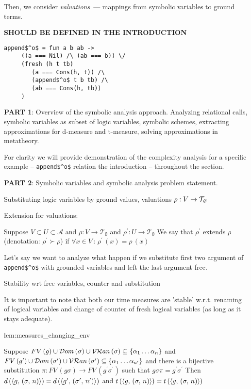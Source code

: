 Then, we consider
\emph{valuations}~--- mappings from symbolic variables to ground terms.


\colorbox{red!20}{\textbf{SHOULD BE DEFINED IN THE INTRODUCTION}}
\begin{lstlisting}[basicstyle=\small]
   append$^o$ = fun a b ab ->
     ((a === Nil) /\ (ab === b)) \/
     (fresh (h t tb)
        (a === Cons(h, t)) /\
        (append$^o$ t b tb) /\
        (ab === Cons(h, tb)) 
     )
\end{lstlisting}

\colorbox{blue!20}{\parbox{\textwidth}{\textbf{PART 1}: Overview of the symbolic analysis approach.
Analyzing relational calls, symbolic variables as subset of logic variables, symbolic schemes, extracting approximations for d-measure and t-measure, solving approximations in metatheory.}}

For clarity we will provide demonstration of the complexity analysis for a specific example -- \lstinline|append$^o$| relation the introduction  -- throughout the section.

\colorbox{blue!20}{\parbox{\textwidth}{\textbf{PART 2}: Symbolic variables and symbolic analysis problem statement.}}

\colorbox{blue!20}{\parbox{\textwidth}{Substituting logic variables by ground values, valuations $\rho : V \to \mathcal{T}_{\varnothing}$}}

Extension for valuations:

\begin{definition}
  Suppose
  $ V \subset U \subset \mathcal{A} $
  and
  $ \rho \colon V \to \mathcal{T}_{\emptyset} $
  and
  $ \rho^\prime \colon U \to \mathcal{T}_{\emptyset} $
  We say that $\rho^\prime$ extends $\rho$ (denotation: $ \rho^\prime \succ \rho$) if
  $ \forall x \in V \,:\, \rho^\prime\,(x) = \rho\,(x) $
\end{definition}

Let's say we want to analyze what happen if we substitute first two argument of \lstinline|append$^o$| with grounded variables and left the last argument free.

\colorbox{blue!20}{\parbox{\textwidth}{Stability wrt free variables, counter and substitution}}

It is important to note that both our time measures are 'stable' w.r.t. renaming of logical variables and change of counter of fresh logical variables (as long as it stays adequate).

\begin{replemma}{lem:measures_changing_env}

  Suppose $FV\,(g) \cup \mathcal{D}om\,(\sigma) \cup \mathcal{VR}an\,(\sigma) \subseteq \{ \alpha_1\dots\alpha_n \} $ and $FV\,(g^\prime) \cup \mathcal{D}om\,(\sigma^\prime) \cup \mathcal{VR}an\,(\sigma^\prime) \subseteq \{ \alpha_1\dots \alpha_{n^\prime} \} $
  and there is a bijective substitution $\pi \colon FV\,(g \sigma) \to FV\,(g^\prime \sigma^\prime)$  such that  $g \sigma \pi = g^\prime \sigma^\prime $ Then $ d\,(\langle g ,\, (\sigma ,\, n) \rangle) = d\,(\langle g^\prime ,\, (\sigma^\prime ,\, n^\prime) \rangle) $ and $ t\,(\langle g ,\, (\sigma ,\, n) \rangle) = t\,(\langle g ,\, (\sigma ,\, n) \rangle) $

\end{replemma}

